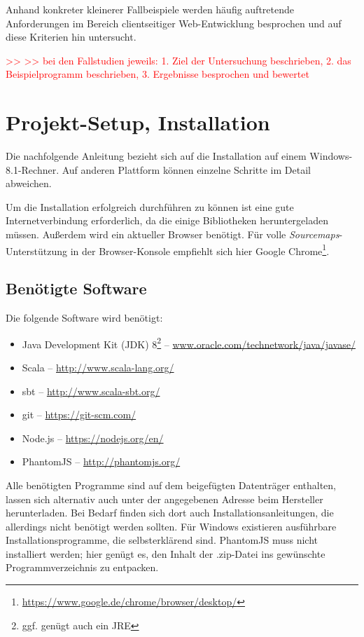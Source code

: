 \documentclass[a4paper, 12pt, hidelinks, listof=totoc, listoftables=totoc, bibliography=totoc]{scrreprt}
\newcommand{\TODO}[1]{\textcolor{red}{#1}\newline}
\begin{document}
Anhand konkreter kleinerer Fallbeispiele werden häufig auftretende Anforderungen im Bereich clientseitiger Web-Entwicklung besprochen und auf diese Kriterien hin untersucht.


\TODO{>> >> bei den Fallstudien jeweils: 1. Ziel der Untersuchung beschrieben, 2. das Beispielprogramm beschrieben, 3. Ergebnisse besprochen und bewertet}



\chapter{Projekt-Setup, Installation}\label{chap:setup}


Die nachfolgende Anleitung bezieht sich auf die Installation auf einem Windows-8.1-Rechner. Auf anderen Plattform können einzelne Schritte im Detail abweichen.

Um die Installation erfolgreich durchführen zu können ist eine gute Internetverbindung erforderlich, da die einige Bibliotheken heruntergeladen müssen. Außerdem wird ein aktueller Browser benötigt. Für volle \textit{Sourcemaps}-Unterstützung in der Browser-Konsole empfiehlt sich hier Google Chrome\footnote{\url{https://www.google.de/chrome/browser/desktop/}}.

\section{Benötigte Software}

Die folgende Software wird benötigt:

\begin{itemize}
	\item Java Development Kit (JDK) 8\footnote{ggf. genügt auch ein JRE}  --  \url{www.oracle.com/technetwork/java/javase/}
	\item Scala  --  \url{http://www.scala-lang.org/}
	\item sbt  --  \url{http://www.scala-sbt.org/}
	\item git  --  \url{https://git-scm.com/}
	\item Node.js  --  \url{https://nodejs.org/en/}
	\item PhantomJS  --  \url{http://phantomjs.org/}
\end{itemize}

Alle benötigten Programme sind auf dem beigefügten Datenträger enthalten, lassen sich alternativ auch unter der angegebenen Adresse beim Hersteller herunterladen. Bei Bedarf finden sich dort auch Installationsanleitungen, die allerdings nicht benötigt werden sollten. Für Windows existieren ausführbare Installationsprogramme, die selbsterklärend sind. PhantomJS muss nicht installiert werden; hier genügt es, den Inhalt der .zip-Datei ins gewünschte Programmverzeichnis zu entpacken.
\end{document}
